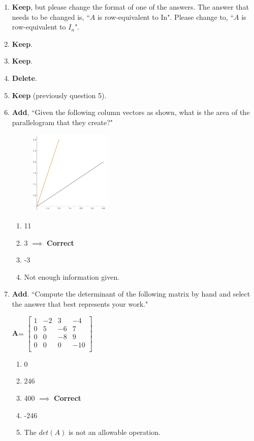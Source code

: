\documentclass[fleqn]{article}[11pt]
\begin{document}
\begin{enumerate}
	\item \textbf{Keep}, but please change the format of one of the answers. The answer that needs to be changed is, ``$A$ is row-equivalent to In". Please change to, ``$A$ is row-equivalent to $I_{n}$".
	
	\item \textbf{Keep}.
	
	\item \textbf{Keep}.
	
	\item \textbf{Delete}.
	
	\item \textbf{Keep} (previously question 5).
	
	\item \textbf{Add}, ``Given the following column vectors as shown, what is the area of the parallelogram that they create?"
	
		\begin{figure}[h!]
			\raggedright
				\graphicspath{{/Users/tylertrogden/Desktop/}}
				\includegraphics[height=4cm,width=4cm]{W08_GQ_Q4} 
		\end{figure}
			\begin{enumerate}
				\item 11
				\item 3 $\implies$ \textbf{Correct}
				\item -3
				\item Not enough information given.
			\end{enumerate}
	
	\item \textbf{Add}. ``Compute the determinant of the following matrix by hand and select the answer that best represents your work."
	
	$\mathbf{A}$=
	\(\begin{bmatrix}
		1 & -2 & 3 & -4 \\
		0 & 5 & -6 & 7 \\
		0 & 0 & -8 & 9 \\
		0 & 0 & 0 & -10 \\
	\end{bmatrix}\)
	\begin{enumerate}
		\item 0
		\item 246
		\item 400 $\implies$ \textbf{Correct}
		\item -246
		\item The $det(A)$ is not an allowable operation.
	\end{enumerate}
\end{enumerate}
\end{document}

